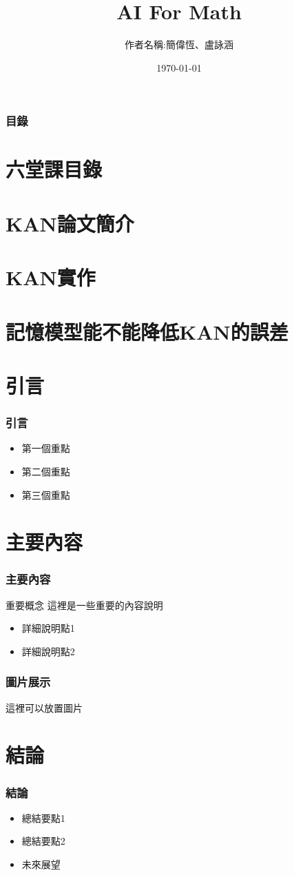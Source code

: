 \documentclass{beamer}
\title{AI For Math}
\author{作者名稱:簡偉恆、盧詠涵}
\institute{輔仁大學 數學系 資訊數學組一年級}
\date{\today}
\begin{document}
\frame{\titlepage}

\begin{frame}
    \frametitle{目錄}
    \section{六堂課目錄}
    \section{KAN論文簡介}
    \section{KAN實作}
    \section{記憶模型能不能降低KAN的誤差}
    \tableofcontents
\end{frame}

\section{引言}
\begin{frame}
    \frametitle{引言}
    \begin{itemize}
        \item 第一個重點
        \item 第二個重點
        \item 第三個重點
    \end{itemize}
\end{frame}

\section{主要內容}
\begin{frame}
    \frametitle{主要內容}
    \begin{block}{重要概念}
        這裡是一些重要的內容說明
    \end{block}
    \begin{itemize}
        \item 詳細說明點1
        \item 詳細說明點2
    \end{itemize}
\end{frame}

\begin{frame}
    \frametitle{圖片展示}
    \centerline{這裡可以放置圖片}
\end{frame}

\section{結論}
\begin{frame}
    \frametitle{結論}
    \begin{itemize}
        \item 總結要點1
        \item 總結要點2
        \item 未來展望
    \end{itemize}
\end{frame}
\end{document}

